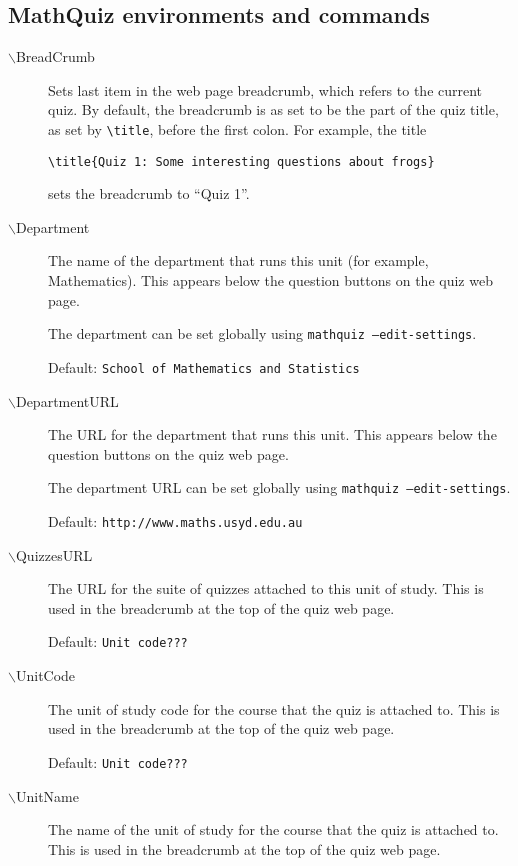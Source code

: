 \documentclass[svgnames]{article}
\begin{document}
\subsection{MathQuiz environments and commands}
\begin{description}
  \item[$\backslash$BreadCrumb]
     Sets last item in the web page breadcrumb, which refers to the
     current quiz. By default, the breadcrumb is as set to be the
     part of the quiz title, as set by \verb!\title!,
     before the first colon. For example, the title

     \hspace*{20mm}\verb!\title{Quiz 1: Some interesting questions about frogs}!

     sets the breadcrumb to ``Quiz 1''.

  \item[$\backslash$Department]
    The name of the department that runs this unit (for example,
    Mathematics). This appears below the question buttons on the quiz web
    page.

    The department can be set globally using \texttt{mathquiz --edit-settings}.

    Default: \texttt{School of Mathematics and Statistics}

  \item[$\backslash$DepartmentURL]
    The URL for the department that runs this unit. This appears below
    the question buttons on the quiz web page.

    The department URL can be set globally using \texttt{mathquiz --edit-settings}.

    Default: \texttt{http://www.maths.usyd.edu.au}

  \item[$\backslash$QuizzesURL]
    The URL for the suite of quizzes attached to this unit of study. This
    is used in the breadcrumb at the top of the quiz web page.

    Default: \texttt{Unit code???}

  \item[$\backslash$UnitCode]
    The unit of study code for the course that the quiz is attached
    to. This is used in the breadcrumb at the top of the quiz web page.

    Default: \texttt{Unit code???}

  \item[$\backslash$UnitName]
    The name of the unit of study for the course that the quiz is attached
    to. This is used in the breadcrumb at the top of the quiz web page.


\end{description}
\end{document}
